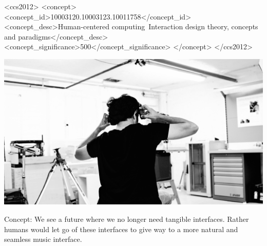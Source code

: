 \documentclass[acmtog]{acmart}
\begin{document}
\begin{CCSXML}
<ccs2012>
   <concept>
       <concept_id>10003120.10003123.10011758</concept_id>
       <concept_desc>Human-centered computing~Interaction design theory, concepts and paradigms</concept_desc>
       <concept_significance>500</concept_significance>
       </concept>
 </ccs2012>
\end{CCSXML}



\begin{teaserfigure}
  \includegraphics[width=\textwidth]{acmart-master-2/samples/test2bw.png}
  \caption{Concept: We see a future where we no longer need tangible interfaces. Rather humans would let go of these interfaces to give way to a more natural and seamless music interface.}
  \label{fig:teaser}
\end{teaserfigure}
\maketitle
\end{document}
